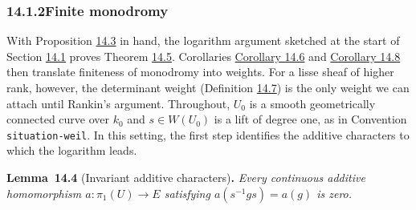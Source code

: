 \documentclass[11pt]{article}
\newenvironment{bpstatement}[2]{\par\addvspace{0.6\baselineskip}\noindent\textbf{#1}#2\textbf{.}\enspace\ignorespaces}
  {\par\addvspace{0.4\baselineskip}}
\newenvironment{bpstatementit}[2]{\begin{bpstatement}{#1}{#2}\itshape\ignorespaces}{\end{bpstatement}}
\newcommand{\bpslug}[1]{\texttt{#1}}
\begin{document}
\subsubsection*{\texorpdfstring{14.1.2\quad Finite monodromy}{14.1.2 Finite monodromy}}
\label{bp15}%
\label{bp16}%
With Proposition \hyperref[bp13]{14.3} in hand, the logarithm argument sketched at the start of Section \hyperref[bp3]{14.1} proves Theorem \hyperref[bp20]{14.5}. Corollaries \hyperref[bp23]{Corollary 14.6} and \hyperref[bp27]{Corollary 14.8} then translate finiteness of monodromy into weights. For a lisse sheaf of higher rank, however, the determinant weight (Definition \hyperref[bp26]{14.7}) is the only weight we can attach until Rankin's argument. Throughout, \(U_0\) is a smooth geometrically connected curve over \(k_0\) and \(s\in W(U_0)\) is a lift of degree one, as in Convention \bpslug{situation-{}\allowbreak{}weil}. In this setting, the first step identifies the additive characters to which the logarithm leads.

\label{bp17}%
\begin{bpstatementit}{Lemma~14.4}{ (Invariant additive characters)}
Every continuous additive homomorphism \(a:\pi_1(U)\to E\) satisfying \(a(s^{-1}gs)=a(g)\) is zero.
\end{bpstatementit}
\end{document}

